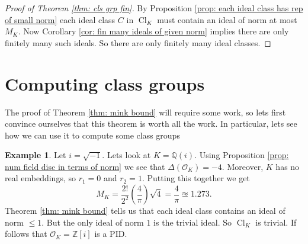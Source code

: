 \documentclass[11pt,a4paper]{report}
\theoremstyle{plain}
\theoremstyle{definition}
\newtheorem{exmp}[subsection]{Example}
\theoremstyle{definition}
\newcommand{\ZZ}{\mathbb{Z}}
\def\QQ{\mathbb{Q}}
\def \OO {\mathcal{O}}
\DeclareMathOperator{\Cl}{Cl}
\begin{document}
	\begin{proof}[Proof of Theorem \ref{thm: cls grp fin}]
		By Proposition \ref{prop: each ideal class has rep of small norm} each ideal class $C$ in $\Cl_K$ must contain an ideal of norm at most $M_K$. Now  Corollary \ref{cor: fin many ideals of given norm} implies there are only finitely many such ideals. So there are only finitely many ideal classes.
	\end{proof}
	
	\section{Computing class groups}
	
	The proof of Theorem \ref{thm: mink bound} will require some work, so lets first convince ourselves that this theorem is worth all the work. In particular, lets see how we can use it to compute some class groups
	
	\begin{exmp}
		Let $i=\sqrt{-1}$. Lets look at $K=\QQ(i)$. Using Proposition \ref{prop: num field disc in terms of norm} we see that $\Delta(\OO_K)=-4$. Moreover, $K$ has no real embeddings, so $r_1=0$ and $r_2=1$. Putting this together we get \[M_K=\frac{2!}{2^2} \left(\frac{4}{\pi}\right)\sqrt{4}=\frac{4}{\pi} \approxeq 1.273.\] Theorem \ref{thm: mink bound} tells us that each ideal class contains an ideal of norm $\leq 1$. But the only ideal of norm $1$ is the trivial ideal. So $\Cl_K$ is trivial. If follows that $\OO_K=\ZZ[i]$ is a PID. 
	\end{exmp}
	
\end{document}
